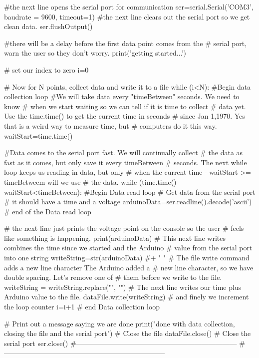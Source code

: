 \begin{python}
#the next line opens the serial port for communication
ser=serial.Serial('COM3', baudrate = 9600, timeout=1)
#the next line clears out the serial port so we get clean data.
ser.flushOutput()
 
#there will be a delay before the first data point comes from the 
#  serial port, warn the user so they don't worry.
print('getting started...')
 
# set our index to zero
i=0
 
 
# Now for N points, collect data and write it to a file
while (i<N):    #Begin data collection loop
    #We will take data every "timeBetween" seconds. We need to know 
    #   when we start waiting so we can tell if it is time to collect 
    #   data yet. Use the time.time() to get the current time in seconds
    #   since Jan 1,1970. Yes that is a weird way to measure time, but 
    #   computers do it this way.
    waitStart=time.time()
    
    #Data comes to the serial port fast. We will continually collect 
    #  the data as fast as it comes, but only save it every timeBetween
    #  seconds. The next while loop keeps us reading in data, but only 
    #  when the current time - waitStart >= timeBetweem will we use 
    #  the data.
    while (time.time()-waitStart<timeBetween): #Begin Data read loop
         # Get data from the serial port
         # it should have a time and a voltage
         arduinoData=ser.readline().decode('ascii')
         # end of the Data read loop
         
    # the next line just prints the voltage point on the console so the user 
    # feels like something is happening.
    print(arduinoData)
    # This next line writes combines the time since we started and the Arduino 
    # value from the serial port into one string
    writeString=str(arduinoData) #+ " \n"
    # The file write command adds a new line character The Arduino added a 
    #   new line character, so we have double spacing. Let's remove one of 
    #   them before we write to the file.
    writeString = writeString.replace("\n", "")
    # The next line writes our time plus Arduino value to the file.
    dataFile.write(writeString)
    # and finely we increment the loop counter
    i=i+1      # end Data collection loop   
    
# Print out a message saying we are done
print("done with data collection, closing the file and the serial port")
# Close the file
dataFile.close()
# Close the serial port   
ser.close() 
#---------------------------------------------------------------------
#---------------------------------------------------------------------
 
 \end{python}

